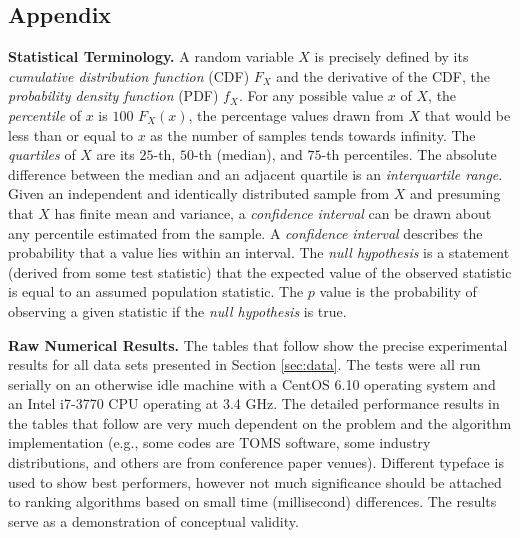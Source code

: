 \documentclass[smallextended,final]{svjour3}  %
\begin{document}
\begin{appendix}
\section{Appendix}
\label{sec:appendix}

\begin{normalsize}
\textbf{Statistical Terminology.} A random variable $X$ is precisely
defined by its \textit{cumulative distribution function} (CDF) $F_X$
and the derivative of the CDF, the \textit{probability density
  function} (PDF) $f_X.$ For any possible value $x$ of $X$, the
\textit{percentile} of $x$ is $100$ $F_X(x)$, the percentage values
drawn from $X$ that would be less than or equal to $x$ as the number
of samples tends towards infinity. The \textit{quartiles} of $X$ are
its $25$-th, $50$-th (median), and $75$-th percentiles. The absolute
difference between the median and an adjacent quartile is an
\textit{interquartile range}. Given an independent and identically
distributed sample from $X$ and presuming that $X$ has finite mean and
variance, a \textit{confidence interval} can be drawn about any
percentile estimated from the sample. A \textit{confidence interval}
describes the probability that a value lies within an interval. The
\textit{null hypothesis} is a statement (derived from some test
statistic) that the expected value of the observed statistic is equal
to an assumed population statistic. The $p$ value is the probability
of observing a given statistic if the \textit{null hypothesis} is
true.

\vspace{4mm}
\noindent \textbf{Raw Numerical Results.} The tables that follow show the
precise experimental results for all data sets presented in Section
\ref{sec:data}. The tests were all run serially on an otherwise idle
machine with a CentOS 6.10 operating system and an Intel i7-3770 CPU
operating at 3.4 GHz. The detailed performance results in the tables
that follow are very much dependent on the problem and the algorithm
implementation (e.g., some codes are TOMS software, some industry
distributions, and others are from conference paper venues). Different
typeface is used to show best performers, however not much
significance should be attached to ranking algorithms based on small
time (millisecond) differences. The results serve as a demonstration
of conceptual validity.

\end{normalsize}

\newpage


\end{appendix}
\end{document}
